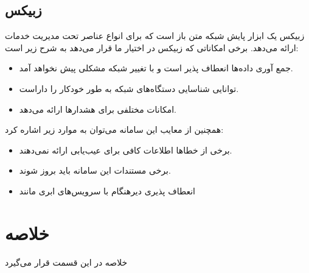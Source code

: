 \subsection{زبیکس}

زبیکس یک ابزار پایش شبکه متن باز است که برای انواع عناصر تحت مدیریت خدمات ارائه می‌دهد. برخی امکاناتی که زبیکس در اختیار ما قرار می‌دهد به شرح زیر است\cite{olups2010zabbix}:

\begin{itemize}
    \item جمع آوری داده‌ها انعطاف پذیر است و با تغییر شبکه مشکلی پیش نخواهد آمد.
    \item توانایی شناسایی دستگاه‌های شبکه به طور خودکار را داراست.
    \item امکانات مختلفی برای هشدارها ارائه می‌دهد.
\end{itemize}
\newpage
همچنین از معایب این سامانه می‌توان به موارد زیر اشاره کرد:

\begin{itemize}
    \item برخی از خطاها اطلاعات کافی برای عیب‌یابی ارائه نمی‌دهند.
    \item برخی مستندات این سامانه باید بروز شوند.
    \item انعطاف پذیری دیرهنگام با سرویس‌های ابری مانند 
\end{itemize}

\section{خلاصه}

خلاصه در این قسمت قرار می‌گیرد

